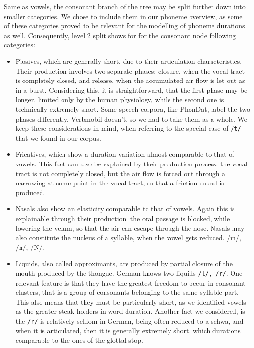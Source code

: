 \documentclass[11pt,a4paper]{scrbook}
\begin{document}
Same as vowels, the consonant branch of the tree may be split further down into smaller categories. We chose to include them in our phoneme overview, as some of these categories proved to be relevant for the modelling of phoneme durations as well. Consequently, level 2 split shows for for the consonant node following categories:
\begin{itemize}
	\item Plosives, which are generally short, due to their articulation characteristics. Their production involves two separate phases: closure, when the vocal tract is completely closed, and release, when the accumulated air flow is let out as in a burst. Considering this, it is straightforward, that the first phase may be longer, limited only by the human physiology, while the second one is technically extremely short. Some speech corpora, like PhonDat, label the two phases differently. Verbmobil doesn't, so we had to take them as a whole. We keep these considerations in mind, when referring to the special case of \texttt{/t/} that we found in our corpus.
	\item Fricatives, which show a duration variation almost comparable to that of vowels. This fact can also be explained by their production process: the vocal tract is not completely closed, but the air flow is forced out through a narrowing at some point in the vocal tract, so that a friction sound is produced.
	\item Nasals also show an elasticity comparable to that of vowels. Again this is explainable through their production: the oral passage is blocked, while lowering the velum, so that the air can escape through the nose. Nasals may also constitute the nucleus of a syllable, when the vowel gets reduced. /m/, /n/, /N/.
	\item Liquids, also called approximants, are produced by partial closure of the mouth produced by the thongue. German knows two liquids \texttt{/l/, /r/}.   One relevant feature is that they have the greatest freedom to occur in consonant clusters, that is a group of consonants belonging to the same syllable part. This also means that they must be particularly short, as we identified vowels as the greater steak holders in word duration. Another fact we considered, is the \texttt{/r/} is relatively seldom in German, being often reduced to a schwa, and when it is articulated, then it is generally extremely short, which durations comparable to the ones of the glottal stop.
\end{itemize}
\end{document}
